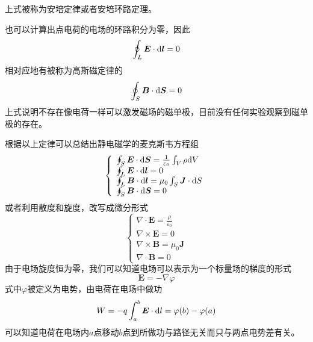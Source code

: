 \documentclass[UTF8,a4paper,10pt]{ctexart}
\begin{document}
\begin{multicols}{2}
\begin{equation}
        \end{equation}
        上式被称为安培定律或者安培环路定理。\par
        也可以计算出点电荷的电场的环路积分为零，因此
        \begin{equation}
            \oint_L\bm{E}\cdot{\rm d}\bm{l} = 0
        \end{equation}
        相对应地有被称为高斯磁定律的
        \begin{equation}
            \oint_S\bm{B}\cdot{\rm d}\bm{S} = 0
        \end{equation}
        上式说明不存在像电荷一样可以激发磁场的磁单极，目前没有任何实验观察到磁单极的存在。\par
        根据以上定律可以总结出静电磁学的麦克斯韦方程组
        \begin{equation}
            \left\{\begin{array}{l}
                \oint_S\bm{E}\cdot{\rm d}\bm{S} = \frac{1}{\varepsilon_0}\int_V\rho{\rm d}V\\
                \oint_L\bm{E}\cdot{\rm d}\bm{l} = 0\\
                \oint_L\bm{B}\cdot{\rm d}\bm{l} = \mu_0\int_S\bm{J}\cdot{\rm d}S\\
                \oint_S\bm{B}\cdot{\rm d}\bm{S} = 0
            \end{array}\right.
        \end{equation}
        或者利用散度和旋度，改写成微分形式
        \begin{equation}
            \left\{\begin{array}{l}
                \nabla\cdot\bm{E} = \frac{\rho}{\varepsilon_0}\\
                \nabla\times\bm{E} = 0\\
                \nabla\times\bm{B} = \mu_0\bm{J}\\
                \nabla\cdot\bm{B} = 0
            \end{array}\right.
        \end{equation}
        由于电场旋度恒为零，我们可以知道电场可以表示为一个标量场的梯度的形式
        \begin{equation}
            \bm{E} = -\nabla\varphi
        \end{equation}
        式中$\varphi$被定义为电势，由电荷在电场中做功
        \begin{equation}
            W = -q\int_a^b\bm{E}\cdot{\rm d}l = \varphi(b)-\varphi(a)
        \end{equation}
        可以知道电荷在电场内$a$点移动$b$点到所做功与路径无关而只与两点电势差有关。

\end{multicols}
\end{document}
